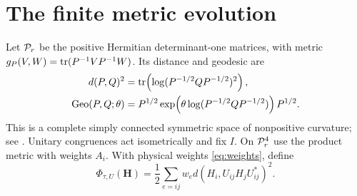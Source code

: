 \section{The finite metric evolution}\label{sec:finite-flow}

Let $\mathcal P_r$ be the positive Hermitian determinant-one
matrices, with metric
$g_P(V,W)=\operatorname{tr}(P^{-1}VP^{-1}W)$. Its distance and geodesic are
\begin{equation}\label{eq:matrix-geometry}
 \begin{split}
 d(P,Q)^2&=\operatorname{tr}\!\left(\log(P^{-1/2}QP^{-1/2})^2\right),\\
 \operatorname{Geo}(P,Q;\theta)&=P^{1/2}
 \exp\!\left(\theta\log(P^{-1/2}QP^{-1/2})\right)P^{1/2}.
 \end{split}
\end{equation}
This is a complete simply connected symmetric space of
nonpositive curvature; see \cite[Sections~2.3--2.6]{bhatia}.
Unitary congruences act isometrically and fix $I$.
On $\mathcal P_r^4$ use the product metric with weights $A_i$.
With physical weights \eqref{eq:weights}, define
\begin{equation}\label{eq:finite-potential}
 \Phi_{\tau,U}(\mathbf H)
 =\frac12\sum_{e=ij}w_e
          d(H_i,U_{ij}H_jU_{ij}^*)^2.
\end{equation}

